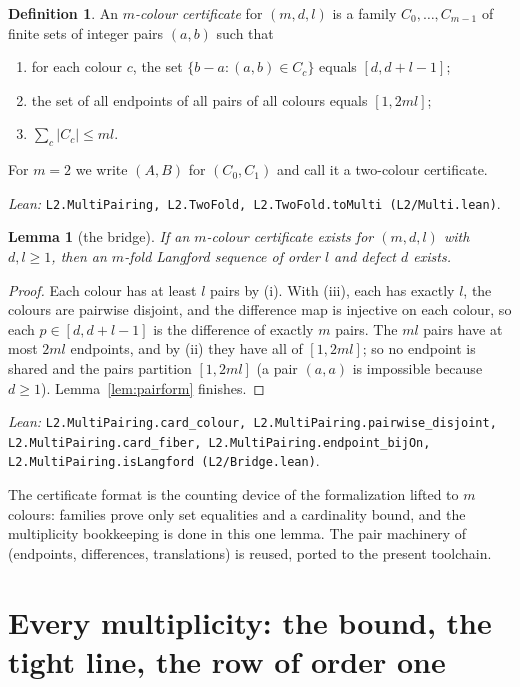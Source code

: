 \documentclass[11pt]{amsart}
\theoremstyle{plain}
\newtheorem{lemma}[theorem]{Lemma}
\theoremstyle{definition}
\newtheorem{definition}[theorem]{Definition}
\theoremstyle{remark}
\newcommand{\lean}[1]{\par\smallskip
  {\small\raggedright\noindent\textit{Lean:} \texttt{#1}.\par}\smallskip}
\begin{document}
\begin{definition}\label{def:cert}
An \emph{$m$-colour certificate} for $(m,d,l)$ is a family $C_0,\dots,C_{m-1}$ of finite
sets of integer pairs $(a,b)$ such that
\begin{enumerate}
\item for each colour $c$, the set $\{b-a : (a,b) \in C_c\}$ equals $[d,d+l-1]$;
\item the set of all endpoints of all pairs of all colours equals $[1,2ml]$;
\item $\sum_c |C_c| \le ml$.
\end{enumerate}
For $m = 2$ we write $(A,B)$ for $(C_0,C_1)$ and call it a two-colour certificate.
\end{definition}
\lean{L2.MultiPairing, L2.TwoFold, L2.TwoFold.toMulti (L2/Multi.lean)}

\begin{lemma}[the bridge]\label{lem:bridge}
If an $m$-colour certificate exists for $(m,d,l)$ with $d,l \ge 1$, then an $m$-fold
Langford sequence of order $l$ and defect $d$ exists.
\end{lemma}

\begin{proof}
Each colour has at least $l$ pairs by (i). With (iii), each has exactly $l$, the colours
are pairwise disjoint, and the difference map is injective on each colour, so each
$p \in [d,d+l-1]$ is the difference of exactly $m$ pairs. The $ml$ pairs have at most
$2ml$ endpoints, and by (ii) they have all of $[1,2ml]$; so no endpoint is shared and
the pairs partition $[1,2ml]$ (a pair $(a,a)$ is impossible because $d \ge 1$). Lemma~\ref{lem:pairform} finishes.
\end{proof}
\lean{L2.MultiPairing.card\_colour, L2.MultiPairing.pairwise\_disjoint,
L2.MultiPairing.card\_fiber, L2.MultiPairing.endpoint\_bijOn,
L2.MultiPairing.isLangford (L2/Bridge.lean)}

The certificate format is the counting device of the formalization \cite{gnlean}
lifted to $m$ colours: families prove only set equalities and a cardinality bound, and
the multiplicity bookkeeping is done in this one lemma. The pair machinery of
\cite{gnlean} (endpoints, differences, translations) is reused, ported to the present
toolchain.

\section{Every multiplicity: the bound, the tight line, the row of order one}\label{sec:allm}
\end{document}

